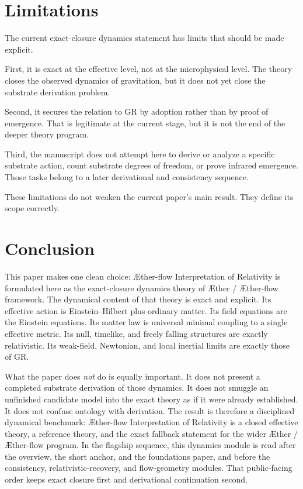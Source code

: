 \documentclass[11pt]{article}
\newcommand{\Aether}{\AE{}ther}
\newcommand{\Aflow}{\AE{}ther-flow}
\newcommand{\TheoryName}{\Aflow{} Interpretation of Relativity}
\newcommand{\TheoryProgram}{\Aether{} / \Aflow{} framework}
\begin{document}
\section{Limitations}

The current exact-closure dynamics statement has limits that should be made explicit.

First, it is exact at the effective level, not at the microphysical level. The theory closes the observed dynamics of gravitation, but it does not yet close the substrate derivation problem.

Second, it secures the relation to GR by adoption rather than by proof of emergence. That is legitimate at the current stage, but it is not the end of the deeper theory program.

Third, the manuscript does not attempt here to derive or analyze a specific substrate action, count substrate degrees of freedom, or prove infrared emergence. Those tasks belong to a later derivational and consistency sequence.

These limitations do not weaken the current paper's main result. They define its scope correctly.

\section{Conclusion}

This paper makes one clean choice: \TheoryName{} is formulated here as the exact-closure dynamics theory of \TheoryProgram{}. The dynamical content of that theory is exact and explicit. Its effective action is Einstein--Hilbert plus ordinary matter. Its field equations are the Einstein equations. Its matter law is universal minimal coupling to a single effective metric. Its null, timelike, and freely falling structures are exactly relativistic. Its weak-field, Newtonian, and local inertial limits are exactly those of GR.

What the paper does \emph{not} do is equally important. It does not present a completed substrate derivation of those dynamics. It does not smuggle an unfinished candidate model into the exact theory as if it were already established. It does not confuse ontology with derivation. The result is therefore a disciplined dynamical benchmark: \TheoryName{} is a closed effective theory, a reference theory, and the exact fallback statement for the wider \Aether{} / \Aflow{} program. In the flagship sequence, this dynamics module is read after the overview, the short anchor, and the foundations paper, and before the consistency, relativistic-recovery, and flow-geometry modules. That public-facing order keeps exact closure first and derivational continuation second.


\end{document}
